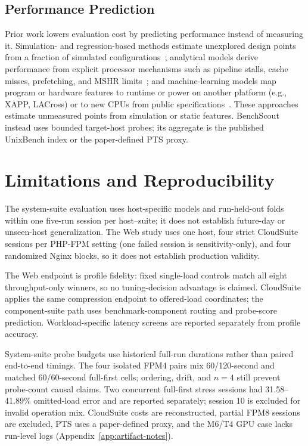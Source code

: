 \documentclass[sigconf, review, anonymous, balance=false]{acmart}
\begin{document}
\subsection{Performance Prediction}
\label{subsec:rw-performance-prediction}
Prior work lowers evaluation cost by predicting performance instead of measuring it.
Simulation- and regression-based methods estimate unexplored design points from a fraction of simulated configurations~\cite{ipek2005approach,ipek2006efficiently,lee2006accurate,sharkawi2009performance}; analytical models derive performance from explicit processor mechanisms such as pipeline stalls, cache misses, prefetching, and MSHR limits~\cite{hartstein2002optimum,eyerman2009mechanistic,chen2011hybrid,eyerman2011mechanistic,van2015micro}; and machine-learning models map program or hardware features to runtime or power on another platform (e.g., XAPP, LACross) or to new CPUs from public specifications~\cite{ardalani2015cross,zheng2016accurate,wang2019predicting,tousi2022comparative}.
These approaches estimate unmeasured points from simulation or static features. BenchScout instead uses bounded target-host probes; its aggregate is the published UnixBench index or the paper-defined PTS proxy.

\section{Limitations and Reproducibility}
\label{sec:limitations}
The system-suite evaluation uses host-specific models and run-held-out folds within one five-run session per host--suite; it does not establish future-day or unseen-host generalization. The Web study uses one host, four strict CloudSuite sessions per PHP-FPM setting (one failed session is sensitivity-only), and four randomized Nginx blocks, so it does not establish production validity.

The Web endpoint is profile fidelity: fixed single-load controls match all eight throughput-only winners, so no tuning-decision advantage is claimed. CloudSuite applies the same compression endpoint to offered-load coordinates; the component-suite path uses benchmark-component routing and probe-score prediction. Workload-specific latency screens are reported separately from profile accuracy.

System-suite probe budgets use historical full-run durations rather than paired end-to-end timings. The four isolated FPM4 pairs mix 60/120-second and matched 60/60-second full-first cells; ordering, drift, and $n=4$ still prevent probe-count causal claims. Two concurrent full-first stress sessions had 31.58--41.89\% omitted-load error and are reported separately; session 10 is excluded for invalid operation mix. CloudSuite costs are reconstructed, partial FPM8 sessions are excluded, PTS uses a paper-defined proxy, and the M6/T4 GPU case lacks run-level logs (Appendix~\ref{app:artifact-notes}).
\end{document}
